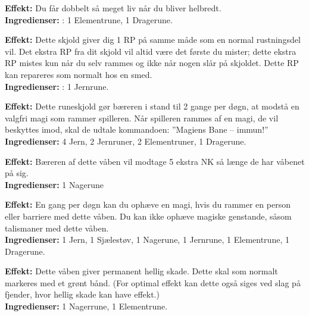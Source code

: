 \begin{runeskjold*}
\textbf{Effekt:} Du får dobbelt så meget liv når du bliver helbredt.\\
\textbf{Ingredienser:} : 1 Elementrune, 1 Dragerune.
\end{runeskjold*}

\begin{runeskjold*}
\textbf{Effekt:} Dette skjold giver dig 1 RP på samme måde som en normal rustningsdel vil. Det ekstra RP fra dit skjold vil altid være det første du mister; dette ekstra RP mistes kun når du selv rammes og ikke når nogen slår på skjoldet. Dette RP kan repareres som normalt hos en smed.\\
\textbf{Ingredienser:} : 1 Jernrune.
\end{runeskjold*}

\begin{runeskjold*}
\textbf{Effekt:} Dette runeskjold gør bæreren i stand til 2 gange per døgn, at modstå en valgfri magi som rammer spilleren. Når spilleren rammes af en magi, de vil beskyttes imod, skal de udtale kommandoen: ”Magiens Bane – immun!”\\
\textbf{Ingredienser:} 4 Jern, 2 Jernruner, 2 Elementruner, 1 Dragerune.
\end{runeskjold*}

\begin{runevåben*}
\textbf{Effekt:} Bæreren af dette våben vil modtage 5 ekstra NK så længe de har våbenet på sig.\\
\textbf{Ingredienser:} 1 Nagerune
\end{runevåben*}

\begin{runevåben*}[Heksejægeren]
\textbf{Effekt:} En gang per døgn kan du ophæve en magi, hvis du rammer en person eller barriere med dette våben. Du kan ikke ophæve magiske genstande, såsom talismaner med dette våben.\\
\textbf{Ingredienser:} 1 Jern, 1 Sjælestøv, 1 Nagerune, 1 Jernrune, 1 Elementrune, 1 Dragerune.
\end{runevåben*}

\begin{runevåben*}
\textbf{Effekt:} Dette våben giver permanent hellig skade. Dette skal som normalt markeres med et grønt bånd. (For optimal effekt kan dette også siges ved slag på fjender, hvor hellig skade kan have effekt.)\\
\textbf{Ingredienser:} 1 Nagerrune, 1 Elementrune.
\end{runevåben*}


